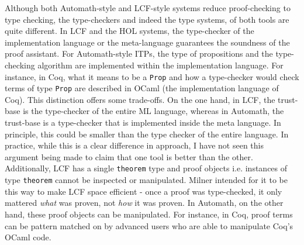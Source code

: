 \documentclass{article}
\begin{document}
  	Although both Automath-style and 
  	LCF-style systems reduce proof-checking
  	to type checking, the type-checkers 
  	and indeed the type systems, 
  	of both tools are quite different.
  	In LCF and the HOL systems, the 
  	type-checker of the implementation 
  	language or the meta-language 
  	guarantees the soundness of the
  	proof assistant. For Automath-style
  	ITPs, the type of propositions and the 
  	type-checking algorithm are 
  	implemented within the 
  	implementation language. For 
  	instance, in Coq, what it means to 
  	be a \texttt{Prop} and how a 
  	type-checker would check 
  	terms of type \texttt{Prop} are 
  	described in OCaml (the 
  	implementation language of Coq). 
  	This distinction
  	offers some trade-offs. On the one 
  	hand, in LCF, the trust-base is 
  	the type-checker of the entire
  	ML language, whereas in Automath, 
  	the trust-base is a type-checker
  	that is implemented inside the 
  	meta language. In principle, this 
  	could be smaller than the type
  	checker of the entire language.
  	In practice, while this is a 
  	clear difference in approach,
  	I have not seen this argument 
  	being made to claim that one tool 
  	is better than the other. 
  	Additionally, LCF has a single 
  	\texttt{theorem} type and proof
  	objects i.e. instances of type
  	\texttt{theorem} cannot be 
  	inspected or manipulated. Milner
  	intended for it to be this way
  	to make LCF space efficient - 
  	once a proof was type-checked, 
  	it only mattered \textit{what}
  	was proven, not \textit{how} it 
  	was proven. In Automath, on the 
  	other hand, these proof objects 
  	can be manipulated.
  	For instance, in Coq, proof terms 
  	can be pattern matched on by 
  	advanced users who are able to 
  	manipulate Coq's OCaml code.
  	
\end{document}
